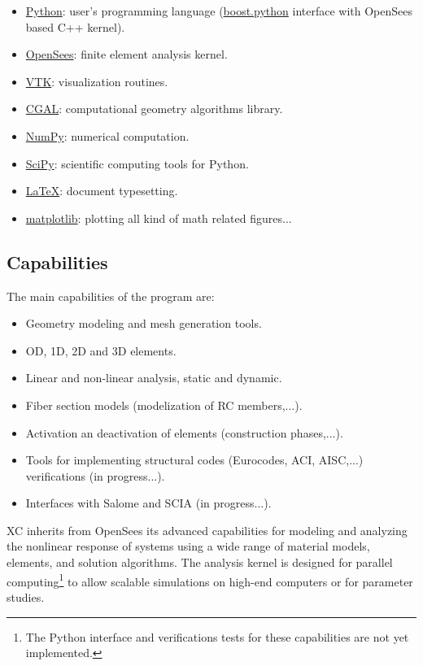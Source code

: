 \begin{itemize}
  \item \href{https://www.python.org/}{Python}: user's programming language (\href{https://wiki.python.org/moin/boost.python}{boost.python} interface with OpenSees based C++ kernel).
  \item \href{http://opensees.berkeley.edu}{OpenSees}: finite element analysis kernel.
  \item \href{http://www.vtk.org/}{VTK}: visualization routines.
  \item \href{http://www.cgal.org/}{CGAL}: computational geometry algorithms library.
  \item \href{http://www.numpy.org/}{NumPy}: numerical computation.
  \item \href{https://www.scipy.org/}{SciPy}: scientific computing tools for Python.
  \item \href{https://www.latex-project.org/}{LaTeX}: document typesetting.
  \item \href{http://matplotlib.org/}{matplotlib}: plotting all kind of math related figures...
\end{itemize}

\subsection{Capabilities}
The main capabilities of the program are:

\begin{itemize}
  \item Geometry modeling and mesh generation tools.
  \item OD, 1D, 2D and 3D elements.
  \item Linear and non-linear analysis, static and dynamic.
  \item Fiber section models (modelization of RC members,...).
  \item Activation an deactivation of elements (construction phases,...).
  \item Tools for implementing structural codes (Eurocodes, ACI, AISC,...) verifications (in progress...).
  \item Interfaces with Salome and SCIA (in progress...).
\end{itemize}

XC inherits from OpenSees its advanced capabilities for modeling and analyzing the nonlinear response of systems using a wide range of material models, elements, and solution algorithms. The analysis kernel is designed for parallel computing\footnote{The Python interface and verifications tests for these capabilities are not yet implemented.} to allow scalable simulations on high-end computers or for parameter studies.

